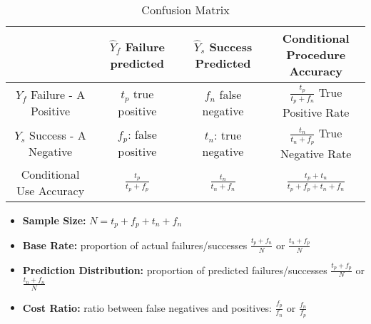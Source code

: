 \label{sec:appendix}

\begin{table}[h]
    \caption{Confusion Matrix}
    \label{tab:confusion}
    \centering
    \begin{tabular}{ c|c|c|c } 
    \toprule
      & \thead{$\hat{Y}_f$ \\ Failure predicted} & \thead{$\hat{Y}_s$ \\ Success Predicted} & \thead{Conditional Procedure \\ Accuracy} \\ 
    \hline
    \thead{$Y_f$ \\ Failure - A Positive} & \makecell{$t_p$ \\ true positive} & \makecell{$f_n$ \\ false negative} & \makecell{$\frac{t_p}{t_p + f_n}$ \\ True Positive Rate} \\ 
    \hline
    \thead{$Y_s$ \\ Success - A Negative} & $f_p$: false positive & $t_n$: true negative & \makecell{$\frac{t_n}{t_n + f_p}$ \\ True Negative Rate } \\ 
    \hline
    \thead{Conditional \\ Use Accuracy} & $\frac{t_p}{t_p + f_p}$ & $\frac{t_n}{t_n + f_n}$ & $\frac{t_p + t_n}{t_p + f_p + t_n + f_n}$ \\ 
    \bottomrule
    \end{tabular}
\end{table}

\begin{itemize}
    \item \textbf{Sample Size:} $N = t_p + f_p + t_n + f_n$
    \item \textbf{Base Rate:} proportion of actual failures/successes $\frac{t_p + f_n}{N}$ or $\frac{t_n + f_p}{N}$
    \item \textbf{Prediction Distribution:} proportion of predicted failures/successes $\frac{t_p + f_p}{N}$ or $\frac{t_n + f_n}{N}$
    \item \textbf{Cost Ratio:} ratio between false negatives and positives: $\frac{f_p}{f_n}$ or $\frac{f_n}{f_p}$
\end{itemize}
